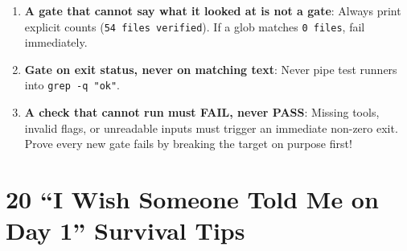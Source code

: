 \documentclass[11pt,oneside]{book}
\begin{document}
\begin{architecturebox}
\begin{enumerate}
  \item \textbf{A gate that cannot say what it looked at is not a gate}: Always print explicit counts (\texttt{54 files verified}). If a glob matches \texttt{0 files}, fail immediately.
  \item \textbf{Gate on exit status, never on matching text}: Never pipe test runners into \texttt{grep -q "ok"}.
  \item \textbf{A check that cannot run must FAIL, never PASS}: Missing tools, invalid flags, or unreadable inputs must trigger an immediate non-zero exit. Prove every new gate fails by breaking the target on purpose first!
\end{enumerate}
\end{architecturebox}

\section{20 ``I Wish Someone Told Me on Day 1'' Survival Tips}
\end{document}
